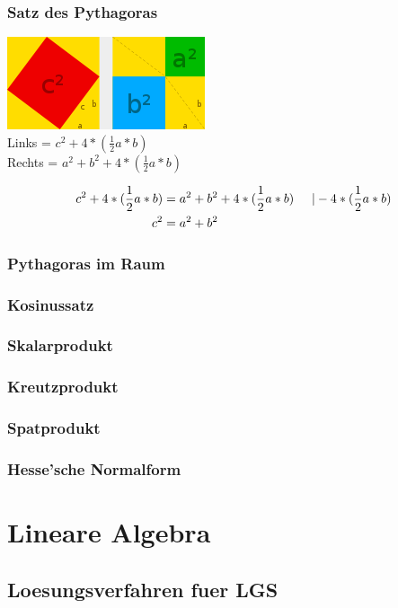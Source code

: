 \documentclass[a4paper]{article} %
\begin{document}
	\subsubsection{Satz des Pythagoras}
	\includegraphics[width=220 px, height=103 px]{pytha.png}\\
	Links = $c^2+ 4*(\frac{1}{2}a*b)$\\
	Rechts = $a^2+b^2+4*(\frac{1}{2}a*b)$

	\begin{align*}
	c^2+ 4*(\frac{1}{2}a*b) &= a^2+b^2+4*(\frac{1}{2}a*b)  \hspace{0.5 cm} |-4*(\frac{1}{2}a*b)\\
	c^2 &= a^2+b^2
	\end{align*}


	
	
	\subsubsection{Pythagoras im Raum}
	\subsubsection{Kosinussatz}
	\subsubsection{Skalarprodukt}
	\subsubsection{Kreutzprodukt}
	\subsubsection{Spatprodukt}
	\subsubsection{Hesse'sche Normalform}
	\section{Lineare Algebra}
	\subsection{Loesungsverfahren fuer LGS}
\end{document}
